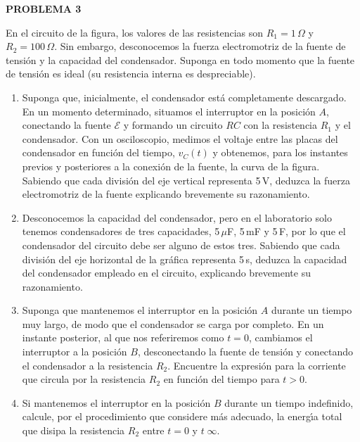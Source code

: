 \textbf{PROBLEMA 3}
\vspace{20px}

En el circuito de la figura, los valores de las resistencias son $R_1 = 1\,\Omega$ y $R_2 = 100\,\Omega$. Sin embargo,
desconocemos la fuerza electromotriz de la fuente de tensión y la capacidad del condensador. Suponga en todo
momento que la fuente de tensión es ideal (su resistencia interna es despreciable).

\begin{enumerate}[label=\alph*.]
    \item Suponga que, inicialmente, el condensador está completamente descargado. En un momento determinado,
    situamos el interruptor en la posición $A$, conectando la fuente $\mathcal{E}$ y formando un circuito $RC$ con la
    resistencia $R_1$ y el condensador. Con un osciloscopio, medimos el voltaje entre las placas del condensador
    en función del tiempo, $v_C (t)$ y obtenemos, para los instantes previos y posteriores a la conexión de la
    fuente, la curva de la figura. Sabiendo que cada división del eje vertical representa 5\,V, deduzca la fuerza
    electromotriz de la fuente explicando brevemente su razonamiento.
    \item Desconocemos la capacidad del condensador, pero en el laboratorio solo tenemos condensadores de tres
    capacidades, 5\,$\mu$F, 5\,mF y 5\,F, por lo que el condensador del circuito debe ser alguno de estos tres. Sabiendo
    que cada división del eje horizontal de la gráfica representa 5\,s, deduzca la capacidad del condensador
    empleado en el circuito, explicando brevemente su razonamiento.
    \item Suponga que mantenemos el interruptor en la posición $A$ durante un tiempo muy largo, de modo que
    el condensador se carga por completo. En un instante posterior, al que nos referiremos como $t = 0$,
    cambiamos el interruptor a la posición $B$, desconectando la fuente de tensión y conectando el condensador
    a la resistencia $R_2$. Encuentre la expresión para la corriente que circula por la resistencia $R_2$ en función
    del tiempo para $t > 0$.
    \item Si mantenemos el interruptor en la posición $B$ durante un tiempo indefinido, calcule, por el procedimiento
    que considere más adecuado, la energı́a total que disipa la resistencia $R_2$ entre $t = 0$ y $t\;$\rightarrow$ \infty$.
\end{enumerate}

